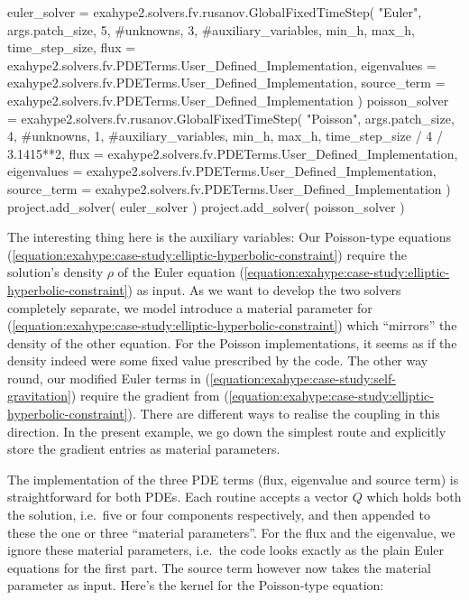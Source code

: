 \begin{code}
euler_solver = exahype2.solvers.fv.rusanov.GlobalFixedTimeStep(
    "Euler",
    args.patch_size,
    5, #unknowns, 
    3, #auxiliary_variables,
    min_h, max_h,
    time_step_size,
    flux = exahype2.solvers.fv.PDETerms.User_Defined_Implementation,
    eigenvalues = exahype2.solvers.fv.PDETerms.User_Defined_Implementation,
    source_term = exahype2.solvers.fv.PDETerms.User_Defined_Implementation
)
poisson_solver = exahype2.solvers.fv.rusanov.GlobalFixedTimeStep(
    "Poisson",
    args.patch_size,
    4, #unknowns, 
    1, #auxiliary_variables,
    min_h, max_h,
    time_step_size / 4 / 3.1415**2,
    flux = exahype2.solvers.fv.PDETerms.User_Defined_Implementation,
    eigenvalues = exahype2.solvers.fv.PDETerms.User_Defined_Implementation,
    source_term = exahype2.solvers.fv.PDETerms.User_Defined_Implementation
)
project.add_solver( euler_solver )
project.add_solver( poisson_solver )
\end{code}


\noindent
The interesting thing here is the auxiliary variables: 
Our Poisson-type equations (\ref{equation:exahype:case-study:elliptic-hyperbolic-constraint}) 
require the solution's density $\rho$ of the Euler equation 
(\ref{equation:exahype:case-study:elliptic-hyperbolic-constraint}) as input.
As we want to develop the two solvers completely separate, we model introduce
a material parameter for (\ref{equation:exahype:case-study:elliptic-hyperbolic-constraint})
which ``mirrors'' the density of the other equation.
For the Poisson implementations, it seems as if the density indeed were some fixed
value prescribed by the code.
The other way round, our modified Euler terms in (\ref{equation:exahype:case-study:self-gravitation}) 
require the gradient from (\ref{equation:exahype:case-study:elliptic-hyperbolic-constraint}).
There are different ways to realise the coupling in this direction.
In the present example, we go down the simplest route and explicitly store
the gradient entries as material parameters.


The implementation of the three PDE terms (flux, eigenvalue and source term) is 
straightforward for both PDEs. 
Each routine accepts a vector $Q$ which holds both the solution, i.e.~five or four 
components respectively, and then appended to these the one or three ``material 
parameters''.
For the flux and the eigenvalue, we ignore these material parameters, i.e.~the code 
looks exactly as the plain Euler equations for the first part.
The source term however now takes the material parameter as input. 
Here's the kernel for the Poisson-type equation:

